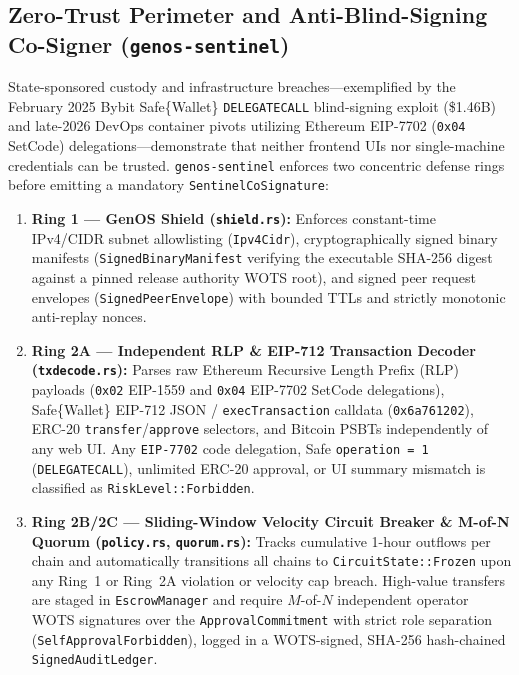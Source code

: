 \documentclass[10pt,journal,compsoc]{IEEEtran}
\theoremstyle{definition}
\begin{document}
\subsection{Zero-Trust Perimeter and Anti-Blind-Signing Co-Signer (\texttt{genos-sentinel})}
State-sponsored custody and infrastructure breaches—exemplified by the February 2025 Bybit Safe\{Wallet\} \texttt{DELEGATECALL} blind-signing exploit (\$1.46B) and late-2026 DevOps container pivots utilizing Ethereum EIP-7702 (\texttt{0x04} SetCode) delegations—demonstrate that neither frontend UIs nor single-machine credentials can be trusted. \texttt{genos-sentinel} enforces two concentric defense rings before emitting a mandatory \texttt{SentinelCoSignature}:
\begin{enumerate}
    \item \textbf{Ring 1 — GenOS Shield (\texttt{shield.rs}):} Enforces constant-time IPv4/CIDR subnet allowlisting (\texttt{Ipv4Cidr}), cryptographically signed binary manifests (\texttt{SignedBinaryManifest} verifying the executable SHA-256 digest against a pinned release authority WOTS root), and signed peer request envelopes (\texttt{SignedPeerEnvelope}) with bounded TTLs and strictly monotonic anti-replay nonces.
    \item \textbf{Ring 2A — Independent RLP \& EIP-712 Transaction Decoder (\texttt{txdecode.rs}):} Parses raw Ethereum Recursive Length Prefix (RLP) payloads (\texttt{0x02} EIP-1559 and \texttt{0x04} EIP-7702 SetCode delegations), Safe\{Wallet\} EIP-712 JSON / \texttt{execTransaction} calldata (\texttt{0x6a761202}), ERC-20 \texttt{transfer}/\texttt{approve} selectors, and Bitcoin PSBTs independently of any web UI. Any \texttt{EIP-7702} code delegation, Safe \texttt{operation = 1} (\texttt{DELEGATECALL}), unlimited ERC-20 approval, or UI summary mismatch is classified as \texttt{RiskLevel::Forbidden}.
    \item \textbf{Ring 2B/2C — Sliding-Window Velocity Circuit Breaker \& M-of-N Quorum (\texttt{policy.rs}, \texttt{quorum.rs}):} Tracks cumulative 1-hour outflows per chain and automatically transitions all chains to \texttt{CircuitState::Frozen} upon any Ring~1 or Ring~2A violation or velocity cap breach. High-value transfers are staged in \texttt{EscrowManager} and require $M$-of-$N$ independent operator WOTS signatures over the \texttt{ApprovalCommitment} with strict role separation (\texttt{SelfApprovalForbidden}), logged in a WOTS-signed, SHA-256 hash-chained \texttt{SignedAuditLedger}.
\end{enumerate}
\end{document}
